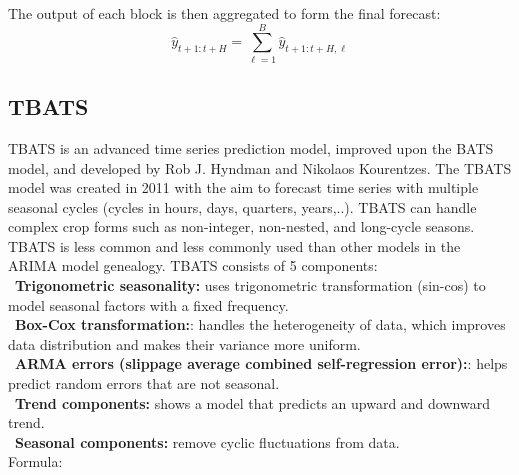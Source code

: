 \documentclass{ieeeojies}
\begin{document}
The output of each block is then aggregated to form the final forecast:
\[
\hat{y}_{t+1:t+H} = \sum_{\ell=1}^{B} \hat{y}_{t+1:t+H,\ell}
\]
    
\subsection{TBATS}
TBATS is an advanced time series prediction model, improved upon the BATS model, and developed by Rob J. Hyndman and Nikolaos Kourentzes. The TBATS model was created in 2011 with the aim to forecast time series with multiple seasonal cycles (cycles in hours, days, quarters, years,..). TBATS can handle complex crop forms such as non-integer, non-nested, and long-cycle seasons.
 \\
 TBATS is less common and less commonly used than other models in the ARIMA model genealogy. TBATS consists of 5 components:\\
\indent\textbullet\ \textbf{Trigonometric seasonality: } uses trigonometric transformation (sin-cos) to model seasonal factors with a fixed frequency.
\\
\indent\textbullet\ \textbf{Box-Cox transformation:}: handles the heterogeneity of data, which improves data distribution and makes their variance more uniform. 
\\
\indent\textbullet\ \textbf{ARMA errors (slippage average combined self-regression error):}: helps predict random errors that are not seasonal.\\
\indent\textbullet\ \textbf{Trend components:} shows a model that predicts an upward and downward trend.\\
\indent\textbullet\ \textbf{Seasonal components: } remove cyclic fluctuations from data.
\\
Formula:\\
\end{document}

